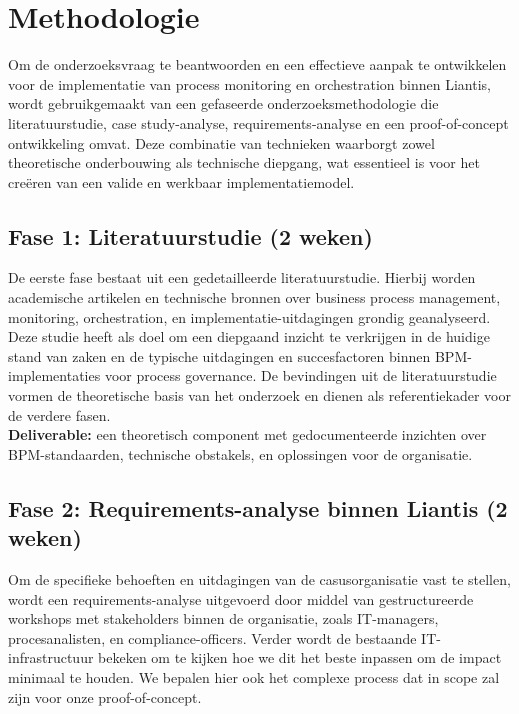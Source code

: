 \section{Methodologie}%
\label{sec:methodologie}

Om de onderzoeksvraag te beantwoorden en een effectieve aanpak te ontwikkelen voor de implementatie van process monitoring en orchestration binnen Liantis, wordt gebruikgemaakt van een gefaseerde onderzoeksmethodologie die literatuurstudie, case study-analyse, requirements-analyse en een proof-of-concept ontwikkeling omvat. Deze combinatie van technieken waarborgt zowel theoretische onderbouwing als technische diepgang, wat essentieel is voor het creëren van een valide en werkbaar implementatiemodel.

\subsection{Fase 1: Literatuurstudie (2 weken)}

De eerste fase bestaat uit een gedetailleerde literatuurstudie. Hierbij worden academische artikelen en technische bronnen over business process management, monitoring, orchestration, en implementatie-uitdagingen grondig geanalyseerd. Deze studie heeft als doel om een diepgaand inzicht te verkrijgen in de huidige stand van zaken en de typische uitdagingen en succesfactoren binnen BPM-implementaties voor process governance. De bevindingen uit de literatuurstudie vormen de theoretische basis van het onderzoek en dienen als referentiekader voor de verdere fasen. \\

\textbf{Deliverable:} een theoretisch component met gedocumenteerde inzichten over BPM-standaarden, technische obstakels, en oplossingen voor de organisatie.

\subsection{Fase 2: Requirements-analyse binnen Liantis (2 weken)}

Om de specifieke behoeften en uitdagingen van de casusorganisatie vast te stellen, wordt een requirements-analyse uitgevoerd door middel van gestructureerde workshops met stakeholders binnen de organisatie, zoals IT-managers, procesanalisten, en compliance-officers. Verder wordt de bestaande IT-infrastructuur bekeken om te kijken hoe we dit het beste inpassen om de impact minimaal te houden. We bepalen hier ook het complexe process dat in scope zal zijn voor onze proof-of-concept. \\

